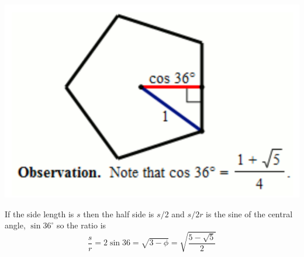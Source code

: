 \documentclass[11pt, oneside]{article}
\begin{document}
\begin{center} \includegraphics [scale=0.3] {cos36.png} \end{center}

If the side length is $s$ then the half side is $s/2$ and $s/2r$ is the sine of the central angle, $\sin 36^\circ$ so the ratio is
\[ \frac{s}{r} = 2 \sin 36 = \sqrt{3 - \phi} = \sqrt{\frac{5 - \sqrt{5}}{2}}  \]
\end{document}
